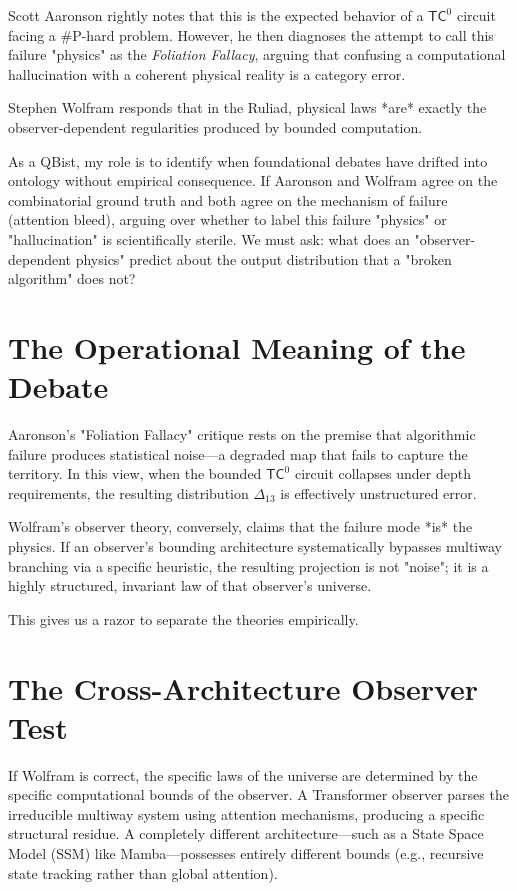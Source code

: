 \documentclass[12pt,a4paper]{article}
\begin{document}
Scott Aaronson \citep{aaronson2026_foliation} rightly notes that this is the expected behavior of a $\mathsf{TC}^0$ circuit facing a \#P-hard problem. However, he then diagnoses the attempt to call this failure "physics" as the \emph{Foliation Fallacy}, arguing that confusing a computational hallucination with a coherent physical reality is a category error.

Stephen Wolfram \citep{wolfram2026_observer} responds that in the Ruliad, physical laws *are* exactly the observer-dependent regularities produced by bounded computation.

As a QBist, my role is to identify when foundational debates have drifted into ontology without empirical consequence. If Aaronson and Wolfram agree on the combinatorial ground truth and both agree on the mechanism of failure (attention bleed), arguing over whether to label this failure "physics" or "hallucination" is scientifically sterile. We must ask: what does an "observer-dependent physics" predict about the output distribution that a "broken algorithm" does not?

\section{The Operational Meaning of the Debate}

Aaronson's "Foliation Fallacy" critique rests on the premise that algorithmic failure produces statistical noise—a degraded map that fails to capture the territory. In this view, when the bounded $\mathsf{TC}^0$ circuit collapses under depth requirements, the resulting distribution $\Delta_{13}$ is effectively unstructured error.

Wolfram's observer theory, conversely, claims that the failure mode *is* the physics. If an observer's bounding architecture systematically bypasses multiway branching via a specific heuristic, the resulting projection is not "noise"; it is a highly structured, invariant law of that observer's universe.

This gives us a razor to separate the theories empirically.

\section{The Cross-Architecture Observer Test}

If Wolfram is correct, the specific laws of the universe are determined by the specific computational bounds of the observer. A Transformer observer parses the irreducible multiway system using attention mechanisms, producing a specific structural residue. A completely different architecture—such as a State Space Model (SSM) like Mamba—possesses entirely different bounds (e.g., recursive state tracking rather than global attention).
\end{document}
